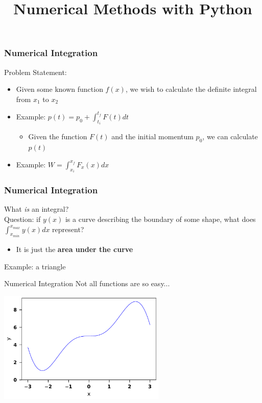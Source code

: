\documentclass{beamer}
\title{Numerical Methods with Python}
\date{}
\begin{document}
	
	\frame{\titlepage}
	
	\begin{frame}
		\frametitle{Numerical Integration}
		Problem Statement:
		\begin{itemize}
			\item <1->Given some known function $f(x)$, we wish to calculate the definite integral from $x_1$ to $x_2$
			\item <2-> Example: $p(t)=p_0+\int_{t_i}^{t_f}F(t)dt$
			\begin{itemize}
				\item Given the function $F(t)$ and the initial momentum $p_0$, we can calculate $p(t)$
			\end{itemize}
			\item <3-> Example: $W=\int_{x_i}^{x_f}F_x(x)dx$
		\end{itemize}
	\end{frame}

	\begin{frame}
		\frametitle{Numerical Integration}
		What \textit{is} an integral?\\
		Question: if $y(x)$ is a curve describing the boundary of some shape, what does $\int_{x_{min}}^{x_{max}}y(x)dx$ represent?
		\begin{itemize}
			\item <2-> It is just the \textbf{area under the curve}
		\end{itemize}
	\end{frame}

	\begin{frame}{Example: a triangle}
		
	\end{frame}

	\begin{frame}{Numerical Integration}
		Not all functions are so easy...
		\begin{center}
		\includegraphics[width=8cm]{complicated_function.pdf}
		\end{center}
	\end{frame}
\end{document}
